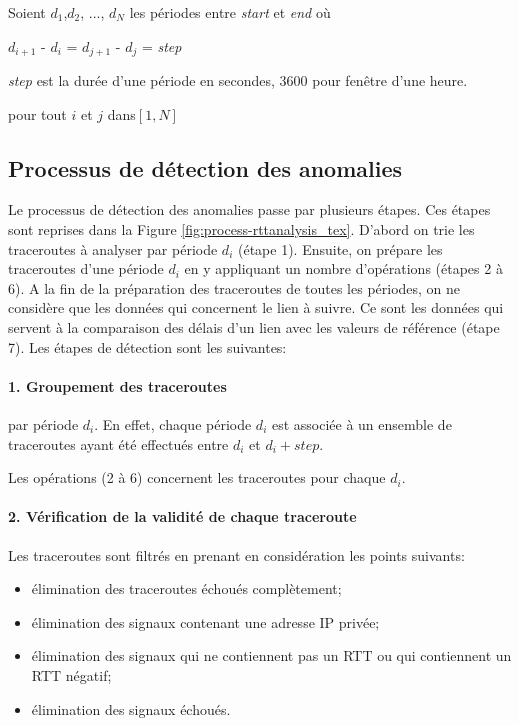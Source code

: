 Soient $ d_1 $,$  d_2 $, ..., $ d_N $ les périodes entre \textit{start} et \textit{end} où

\begin{center}
	 $  d_{i+1} $ - $  d_{i} $ = $  d_{j+1} $ - $  d_{j} $ = \textit{step} 
	 
	 \textit{step} est la durée d'une période en secondes, $3600$ pour fenêtre d'une heure.
\end{center}
 
 pour tout $ i $ et $ j $ dans$  [1,N] $
\subsection{Processus de  détection des anomalies }\label{steps-rtt-analysis}

Le processus de  détection des anomalies passe par plusieurs étapes. Ces étapes sont reprises dans  la Figure \ref{fig:process-rttanalysis_tex}. D'abord on  trie les traceroutes à analyser par période $d_i$ (étape 1). Ensuite, on prépare les traceroutes d'une période $d_i$ en y appliquant un nombre d'opérations (étapes  2 à 6). A la fin de la préparation des traceroutes de toutes les périodes, on ne considère que les données qui concernent le lien à suivre. Ce sont les données qui servent à la comparaison  des  délais d'un lien avec les valeurs de référence (étape 7). Les étapes de détection sont les suivantes:

\paragraph{1. Groupement des traceroutes } par période $d_i$. En effet, chaque période $d_i$ est associée à un ensemble de traceroutes ayant été effectués entre $d_i$ et $d_i + step $. 

Les opérations  (2 à 6) concernent  les traceroutes pour chaque $d_i$.  

\paragraph{2. Vérification de la validité de chaque traceroute} 
Les traceroutes sont filtrés en prenant en considération  les points suivants:
\begin{itemize}
	\item élimination des traceroutes échoués complètement;
	\item élimination des signaux contenant une adresse IP privée;
	\item élimination des signaux qui ne contiennent pas un RTT ou  qui contiennent un RTT négatif;
	\item  élimination des signaux échoués.
\end{itemize}

